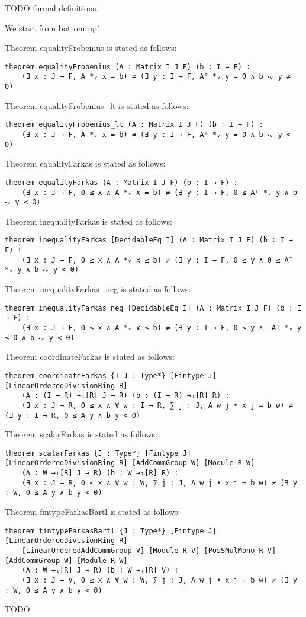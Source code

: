 \documentclass[]{article}
\renewcommand{\.}{\hskip .75pt}
\begin{document}
TODO formal definitions.

We start from bottom up!

\noindent
Theorem equalityFrobenius is stated as follows:
\begin{lstlisting}
theorem equalityFrobenius (A : Matrix I J F) (b : I → F) :
    (∃ x : J → F, A *ᵥ x = b) ≠ (∃ y : I → F, Aᵀ *ᵥ y = 0 ∧ b ⬝ᵥ y ≠ 0)
\end{lstlisting}
Theorem equalityFrobenius\_lt is stated as follows:
\begin{lstlisting}
theorem equalityFrobenius_lt (A : Matrix I J F) (b : I → F) :
    (∃ x : J → F, A *ᵥ x = b) ≠ (∃ y : I → F, Aᵀ *ᵥ y = 0 ∧ b ⬝ᵥ y < 0)
\end{lstlisting}
Theorem equalityFarkas is stated as follows:
\begin{lstlisting}
theorem equalityFarkas (A : Matrix I J F) (b : I → F) :
    (∃ x : J → F, 0 ≤ x ∧ A *ᵥ x = b) ≠ (∃ y : I → F, 0 ≤ Aᵀ *ᵥ y ∧ b ⬝ᵥ y < 0)
\end{lstlisting}
Theorem inequalityFarkas is stated as follows:
\begin{lstlisting}
theorem inequalityFarkas [DecidableEq I] (A : Matrix I J F) (b : I → F) :
    (∃ x : J → F, 0 ≤ x ∧ A *ᵥ x ≤ b) ≠ (∃ y : I → F, 0 ≤ y ∧ 0 ≤ Aᵀ *ᵥ y ∧ b ⬝ᵥ y < 0)
\end{lstlisting}
Theorem inequalityFarkas\_neg is stated as follows:
\begin{lstlisting}
theorem inequalityFarkas_neg [DecidableEq I] (A : Matrix I J F) (b : I → F) :
    (∃ x : J → F, 0 ≤ x ∧ A *ᵥ x ≤ b) ≠ (∃ y : I → F, 0 ≤ y ∧ -Aᵀ *ᵥ y ≤ 0 ∧ b ⬝ᵥ y < 0)
\end{lstlisting}
Theorem coordinateFarkas is stated as follows:
\begin{lstlisting}
theorem coordinateFarkas {I J : Type*} [Fintype J] [LinearOrderedDivisionRing R]
    (A : (I → R) →ₗ[R] J → R) (b : (I → R) →ₗ[R] R) :
    (∃ x : J → R, 0 ≤ x ∧ ∀ w : I → R, ∑ j : J, A w j • x j = b w) ≠ (∃ y : I → R, 0 ≤ A y ∧ b y < 0)
\end{lstlisting}
Theorem scalarFarkas is stated as follows:
\begin{lstlisting}
theorem scalarFarkas {J : Type*} [Fintype J] [LinearOrderedDivisionRing R] [AddCommGroup W] [Module R W]
    (A : W →ₗ[R] J → R) (b : W →ₗ[R] R) :
    (∃ x : J → R, 0 ≤ x ∧ ∀ w : W, ∑ j : J, A w j • x j = b w) ≠ (∃ y : W, 0 ≤ A y ∧ b y < 0)
\end{lstlisting}
Theorem fintypeFarkasBartl is stated as follows:
\begin{lstlisting}
theorem fintypeFarkasBartl {J : Type*} [Fintype J] [LinearOrderedDivisionRing R]
    [LinearOrderedAddCommGroup V] [Module R V] [PosSMulMono R V] [AddCommGroup W] [Module R W]
    (A : W →ₗ[R] J → R) (b : W →ₗ[R] V) :
    (∃ x : J → V, 0 ≤ x ∧ ∀ w : W, ∑ j : J, A w j • x j = b w) ≠ (∃ y : W, 0 ≤ A y ∧ b y < 0)
\end{lstlisting}
TODO.
\end{document}
